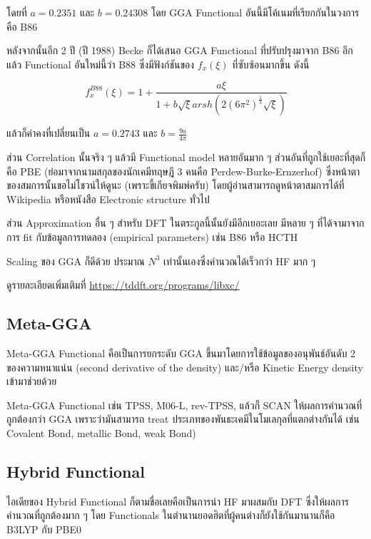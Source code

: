 \noindent โดยที่ $a = 0.2351$ และ $b = 0.24308$ โดย GGA Functional อันนี้มีโค้เนมที่เรียกกันในวงการคือ B86

หลังจากนั้นอีก 2 ปี (ปี 1988) Becke ก็ได้เสนอ GGA Functional ที่ปรับปรุงมาจาก B86 อีกแล้ว Functional
อันใหม่นี้ว่า B88 ซึ่งมีฟังก์ชันของ $f_{x}(\xi)$ ที่ซับซ้อนมากขึ้น ดังนี้ 

\begin{equation}
    f^{B88}_{x}(\xi) = 
    1 + \frac{a\xi}{1 + b\sqrt{\xi} arsh (2(6\pi^{2})^{\frac{1}{3}} \sqrt{\xi })}
\end{equation}

\noindent แล้วก็ค่าคงที่เปลี่ยนเป็น $a = 0.2743$ และ $b = \frac{9a}{4\pi}$

ส่วน Correlation นั้นจริง ๆ แล้วมี Functional model หลายอันมาก ๆ ส่วนอันที่ถูกใช้เยอะที่สุดก็คือ PBE 
(ย่อมาจากนามสกุลของนักเคมีทฤษฎี 3 คนคือ Perdew-Burke-Ernzerhof) ซึ่งหน้าตาของสมการนั้นขอไม่โชวน์ให้ดูนะ
(เพราะขี้เกียจพิมพ์ครับ) โดยผู้อ่านสามารถดูหน้าตาสมการได้ที่ Wikipedia หรือหนังสือ Electronic structure ทั่วไป 

ส่วน Approximation อื่น ๆ สำหรับ DFT ในตระกูลนี้นั้นยังมีอีกเยอะเลย มีหลาย ๆ ที่ได้จามาจากการ fit กับข้อมูลการทดลอง 
(empirical parameters) เช่น B86 หรือ HCTH 

Scaling ของ GGA ก็ดีด้วย ประมาณ $N^{3}$ เท่านั้นเองซึ่งคำนวณได้เร็วกว่า HF มาก ๆ

ดูรายละเอียดเพิ่มเติมที่ \url{https://tddft.org/programs/libxc/}

\subsection{Meta-GGA}

Meta-GGA Functional คือเป็นการยกระดับ GGA ขึ้นมาโดยการใช้ข้อมูลของอนุพันธ์อันดับ 2 ของความหนาแน่น (second 
derivative of the density) และ/หรือ Kinetic Energy density เข้ามาช่วยด้วย 

Meta-GGA Functional เช่น TPSS, M06-L, rev-TPSS, แล้วก็ SCAN ให้ผลการคำนวณที่ถูกต้องกว่า GGA 
เพราะว่ามันสามารถ treat ประเภทของพันธะเคมีในโมเลกุลที่แตกต่างกันได้ เช่น Covalent Bond, metallic Bond, 
weak Bond) 

\subsection{Hybrid Functional}

ไอเดียของ Hybrid Functional ก็ตามชื่อเลยคือเป็นการนำ HF มาผสมกับ DFT ซึ่งให้ผลการคำนวณที่ถูกต้องมาก ๆ 
โดย Functionals ในตำนานยอดฮิตที่ผู้คนต่างก็ยังใช้กันมานานก็คือ B3LYP กับ PBE0 

